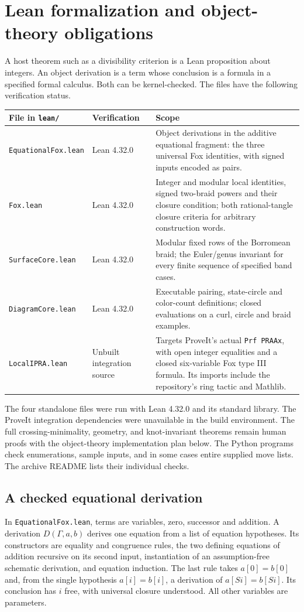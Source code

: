 \section{Lean formalization and object-theory obligations}
\label{sec:lean}
A host theorem such as a divisibility criterion is a Lean proposition about integers. An object derivation is a term whose conclusion is a formula in a specified formal calculus. Both can be kernel-checked. The files have the following verification status.
\begin{center}\small
\renewcommand{\arraystretch}{1.20}
\begin{tabularx}{\linewidth}{@{}p{.237\linewidth}p{.19\linewidth}X@{}}
\toprule File in \texttt{lean/}& Verification & Scope\\\midrule
\texttt{EquationalFox.lean} & Lean 4.32.0 & Object derivations in the additive equational fragment: the three universal Fox identities, with signed inputs encoded as pairs.\\
\texttt{Fox.lean} & Lean 4.32.0 & Integer and modular local identities, signed two-braid powers and their closure condition; both rational-tangle closure criteria for arbitrary construction words.\\
\texttt{SurfaceCore.lean} & Lean 4.32.0 & Modular fixed rows of the Borromean braid; the Euler/genus invariant for every finite sequence of specified band cases.\\
\texttt{DiagramCore.lean} & Lean 4.32.0 & Executable pairing, state-circle and color-count definitions; closed evaluations on a curl, circle and braid examples.\\
\texttt{LocalIPRA.lean} & Unbuilt integration source & Targets ProveIt's actual \texttt{Prf PRAAx}, with open integer equalities and a closed six-variable Fox type III formula. Its imports include the repository's ring tactic and Mathlib.\\\bottomrule
\end{tabularx}
\end{center}
The four standalone files were run with Lean 4.32.0 and its standard library. The ProveIt integration dependencies were unavailable in the build environment. The full crossing-minimality, geometry, and knot-invariant theorems remain human proofs with the object-theory implementation plan below. The Python programs check enumerations, sample inputs, and in some cases entire supplied move lists. The archive README lists their individual checks.

\subsection{A checked equational derivation}
In \texttt{EquationalFox.lean}, terms are variables, zero, successor and addition. A derivation $D(\Gamma,a,b)$ derives one equation from a list of equation hypotheses. Its constructors are equality and congruence rules, the two defining equations of addition recursive on its second input, instantiation of an assumption-free schematic derivation, and equation induction. The last rule takes $a[0]=b[0]$ and, from the single hypothesis $a[i]=b[i]$, a derivation of $a[Si]=b[Si]$. Its conclusion has $i$ free, with universal closure understood. All other variables are parameters.

